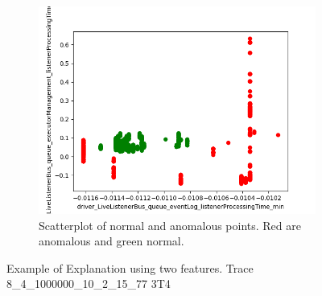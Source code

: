 \documentclass[oneside, a4paper, onecolumn, 11pt]{article}
\begin{document}
\begin{figure}[H]
\begin{subfigure}{0.30\textwidth}
    \includegraphics[width=\linewidth]{images/scatter duo.png}
    \caption{Scatterplot of normal and anomalous points. Red are anomalous and green normal.}
\end{subfigure}
  \caption{Example of Explanation using two features. Trace 8\_4\_1000000\_10\_2\_15\_77 3T4}
  \label{fig:decision_tree_ex}
\end{figure}
\end{document}
